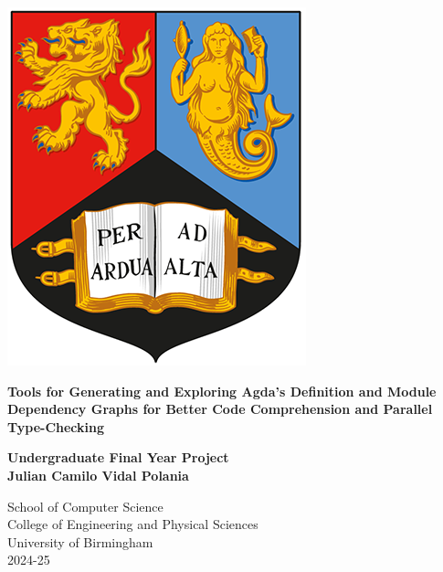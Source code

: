 
\thispagestyle{empty}

\begin{spacing}{2}
	\begin{center}
		\includegraphics[scale = 1.5]{Preamble/BirmCrest.png}
	\end{center}
	\vspace{10mm}
	\begin{center}
		\textbf{\Large Tools for Generating and Exploring Agda's Definition and
			Module Dependency Graphs for Better Code Comprehension and Parallel
		Type-Checking}
		\vspace{10mm}
	\end{center}
	\begin{center}
		\textbf{\large Undergraduate Final Year Project}
		\vspace{20mm}
		\\\textbf{\Large Julian Camilo Vidal Polania}
		\vspace{20mm}
	\end{center}
	\begin{center}
		{\large School of Computer Science}
		\\ {\large College of Engineering and Physical Sciences}
		\\ {\large University of Birmingham}
		\\ {\large 2024-25}
	\end{center}
\end{spacing}


